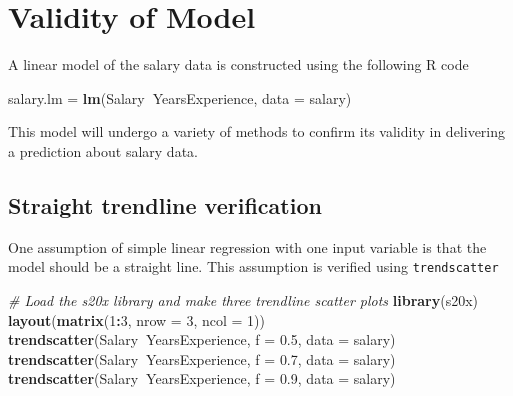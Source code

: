 \documentclass[]{article}
\newenvironment{Shaded}{\begin{snugshade}}{\end{snugshade}}
\newcommand{\CommentTok}[1]{\textcolor[rgb]{0.56,0.35,0.01}{\textit{#1}}}
\newcommand{\DataTypeTok}[1]{\textcolor[rgb]{0.13,0.29,0.53}{#1}}
\newcommand{\DecValTok}[1]{\textcolor[rgb]{0.00,0.00,0.81}{#1}}
\newcommand{\FloatTok}[1]{\textcolor[rgb]{0.00,0.00,0.81}{#1}}
\newcommand{\KeywordTok}[1]{\textcolor[rgb]{0.13,0.29,0.53}{\textbf{#1}}}
\newcommand{\NormalTok}[1]{#1}
\newcommand{\OperatorTok}[1]{\textcolor[rgb]{0.81,0.36,0.00}{\textbf{#1}}}
\newcommand{\StringTok}[1]{\textcolor[rgb]{0.31,0.60,0.02}{#1}}
\begin{document}
\hypertarget{validity-of-model}{%
\section{Validity of Model}\label{validity-of-model}}

A linear model of the salary data is constructed using the following R
code

\begin{Shaded}
\begin{Highlighting}[]
\NormalTok{salary.lm =}\StringTok{ }\KeywordTok{lm}\NormalTok{(Salary}\OperatorTok{~}\NormalTok{YearsExperience, }\DataTypeTok{data =}\NormalTok{ salary)}
\end{Highlighting}
\end{Shaded}

This model will undergo a variety of methods to confirm its validity in
delivering a prediction about salary data.

\hypertarget{straight-trendline-verification}{%
\subsection{Straight trendline
verification}\label{straight-trendline-verification}}

One assumption of simple linear regression with one input variable is
that the model should be a straight line. This assumption is verified
using \texttt{trendscatter}

\begin{Shaded}
\begin{Highlighting}[]
\CommentTok{# Load the s20x library and make three trendline scatter plots}
\KeywordTok{library}\NormalTok{(s20x)}
\KeywordTok{layout}\NormalTok{(}\KeywordTok{matrix}\NormalTok{(}\DecValTok{1}\OperatorTok{:}\DecValTok{3}\NormalTok{, }\DataTypeTok{nrow =} \DecValTok{3}\NormalTok{, }\DataTypeTok{ncol =} \DecValTok{1}\NormalTok{))}
\KeywordTok{trendscatter}\NormalTok{(Salary}\OperatorTok{~}\NormalTok{YearsExperience, }\DataTypeTok{f =} \FloatTok{0.5}\NormalTok{, }\DataTypeTok{data =}\NormalTok{ salary)}
\KeywordTok{trendscatter}\NormalTok{(Salary}\OperatorTok{~}\NormalTok{YearsExperience, }\DataTypeTok{f =} \FloatTok{0.7}\NormalTok{, }\DataTypeTok{data =}\NormalTok{ salary)}
\KeywordTok{trendscatter}\NormalTok{(Salary}\OperatorTok{~}\NormalTok{YearsExperience, }\DataTypeTok{f =} \FloatTok{0.9}\NormalTok{, }\DataTypeTok{data =}\NormalTok{ salary)}
\end{Highlighting}
\end{Shaded}
\end{document}
